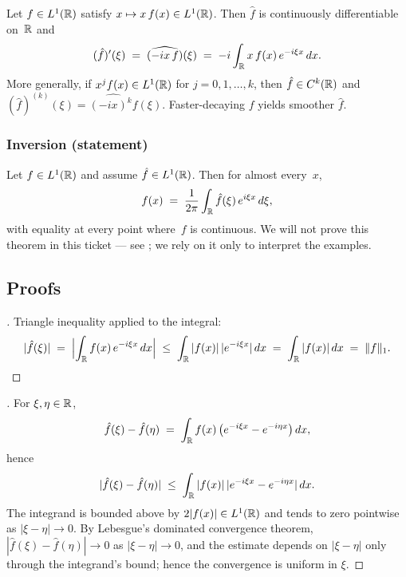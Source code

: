 \begin{theorem}
\label{thm:derivative-of-ft}
Let $f \in L^1(\mathbb{R})$ satisfy $x \mapsto x\, f(x) \in L^1(\mathbb{R})$. Then
$\hat f$ is continuously differentiable on~$\mathbb{R}$ and
\[
  (\hat f)'(\xi) \;=\; \widehat{(- i x\, f)}(\xi) \;=\; -i \int_{\mathbb{R}} x\, f(x)\, e^{-i \xi x}\, dx.
\]
More generally, if $x^j f(x) \in L^1(\mathbb{R})$ for $j = 0, 1, \dots, k$,
then $\hat f \in C^k(\mathbb{R})$ and
$(\hat f)^{(k)}(\xi) = \widehat{(-i x)^k f}(\xi)$. Faster-decaying $f$
yields smoother $\hat f$.
\end{theorem}

\subsubsection*{Inversion (statement)}

\begin{theorem}
\label{thm:fourier-inversion}
Let $f \in L^1(\mathbb{R})$ and assume $\hat f \in L^1(\mathbb{R})$. Then for almost
every~$x$,
\[
  f(x) \;=\; \frac{1}{2\pi} \int_{\mathbb{R}} \hat f(\xi)\, e^{i \xi x}\, d\xi,
\]
with equality at every point where~$f$ is continuous. We will not
prove this theorem in this ticket — see
\cite[Vol.~II, Ch.~XVIII, \S~3]{Zorich1981}; we rely on it only to
interpret the examples.
\end{theorem}

\subsection*{Proofs}

\begin{proof}[]
Triangle inequality applied to the integral:
\[
  |\hat f(\xi)| \;=\; \Bigl| \int_{\mathbb{R}} f(x)\, e^{-i \xi x}\, dx \Bigr|
  \;\leq\; \int_{\mathbb{R}} |f(x)|\, |e^{-i \xi x}|\, dx
  \;=\; \int_{\mathbb{R}} |f(x)|\, dx
  \;=\; \|f\|_1.
\]
\end{proof}

\begin{proof}[]
For $\xi, \eta \in \mathbb{R}$,
\[
  \hat f(\xi) - \hat f(\eta)
  \;=\; \int_{\mathbb{R}} f(x)\, \bigl(e^{-i \xi x} - e^{-i \eta x}\bigr)\, dx,
\]
hence
\[
  |\hat f(\xi) - \hat f(\eta)|
  \;\leq\; \int_{\mathbb{R}} |f(x)|\, |e^{-i \xi x} - e^{-i \eta x}|\, dx.
\]
The integrand is bounded above by $2 |f(x)| \in L^1(\mathbb{R})$ and tends to
zero pointwise as $|\xi - \eta| \to 0$. By Lebesgue's dominated
convergence theorem,
$|\hat f(\xi) - \hat f(\eta)| \to 0$ as $|\xi - \eta| \to 0$, and the
estimate depends on $|\xi - \eta|$ only through the integrand's
bound; hence the convergence is uniform in $\xi$.
\end{proof}

